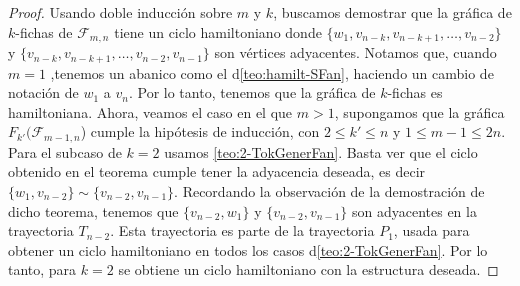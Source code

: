 \begin{proof}
    Usando doble inducci\'on sobre $m$ y $k$, buscamos demostrar que la
    gr\'afica de $k$-fichas de $\mathcal{F}_{m,n}$ tiene un ciclo hamiltoniano
    donde $\{w_1, v_{n-k}, v_{n-k+1}, \dots, v_{n-2}\}$ y $\{v_{n-k}, v_{n-k+1},
    \dots, v_{n-2}, v_{n-1}\}$ son v\'ertices adyacentes. Notamos que, cuando $m
    =1$ ,tenemos un abanico
    como el d\cref{teo:hamilt-SFan}, haciendo un cambio de notaci\'on de $w_1$ a
    $v_n$. Por lo tanto, tenemos que la gr\'afica de
    $k$-fichas es hamiltoniana. Ahora, veamos el caso en el que $m>1$,
    supongamos que la gr\'afica $F_{k'}(\mathcal{F}_{m-1,n}$) cumple la
    hip\'otesis de inducci\'on, con $2\leq k'\leq n$ y $1 \leq m-1 \leq 2n$.
    Para el subcaso de $k=2$ usamos \cref{teo:2-TokGenerFan}. Basta ver que el
    ciclo obtenido en el teorema cumple tener la adyacencia deseada, es decir
    $\{w_1, v_{n-2}\}\sim\{v_{n-2}, v_{n-1}\}$. Recordando la observaci\'on de
    la demostraci\'on de dicho teorema, tenemos que $\{v_{n-2},w_1\}$ y
    $\{v_{n-2},v_{n-1}\}$ son adyacentes en la trayectoria $T_{n-2}$. Esta
    trayectoria es parte de la trayectoria $P_1$, usada para obtener un ciclo
    hamiltoniano en todos los casos d\cref{teo:2-TokGenerFan}. Por lo tanto,
    para $k=2$ se obtiene un ciclo hamiltoniano con la estructura deseada.


\end{proof}
